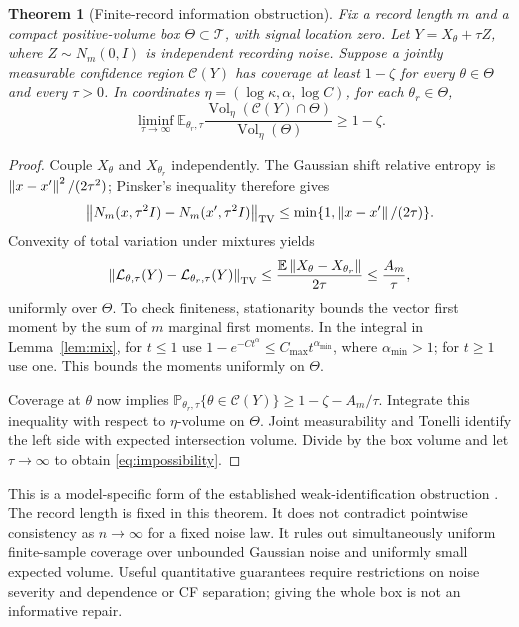 \documentclass[11pt,a4paper]{article}
\newtheorem{theorem}{Theorem}[section]
\theoremstyle{remark}\newtheorem{remark}[theorem]{Remark}
\newcommand{\E}{\mathbb E}\newcommand{\Pp}{\mathbb P}
\DeclareMathOperator{\Vol}{Vol}\DeclareMathOperator*{\argmin}{arg\,min}
\begin{document}
\begin{theorem}[Finite-record information obstruction]\label{thm:impossible}
Fix a record length $m$ and a compact positive-volume box $\Theta\subset\mathcal T$, with signal location zero. Let $Y=X_\theta+\tau Z$, where $Z\sim N_m(0,I)$ is independent recording noise. Suppose a jointly measurable confidence region $\mathcal C(Y)$ has coverage at least $1-\zeta$ for every $\theta\in\Theta$ and every $\tau>0$. In coordinates $\eta=(\log\kappa,\alpha,\log C)$, for each $\theta_r\in\Theta$,
\begin{equation}\label{eq:impossibility}
\liminf_{\tau\to\infty}\E_{\theta_r,\tau}
\frac{\Vol_\eta(\mathcal C(Y)\cap\Theta)}{\Vol_\eta(\Theta)}\ge1-\zeta.
\end{equation}
\end{theorem}
\begin{proof}
Couple $X_\theta$ and $X_{\theta_r}$ independently. The Gaussian shift relative entropy is $\left\lVert x-x'\right\rVert^2/(2\tau^2)$; Pinsker's inequality therefore gives
\[
\left\lVert N_m(x,\tau^2I)-N_m(x',\tau^2I)\right\rVert_{\rm TV}
\le\min\{1,\left\lVert x-x'\right\rVert/(2\tau)\}.
\]
Convexity of total variation under mixtures yields
\[
\norm{\mathcal L_{\theta,\tau}(Y)-\mathcal L_{\theta_r,\tau}(Y)}_{\rm TV}
\le\frac{\E\norm{X_\theta-X_{\theta_r}}}{2\tau}\le\frac{A_m}{\tau},
\]
uniformly over $\Theta$. To check finiteness, stationarity bounds the vector first moment by the sum of $m$ marginal first moments. In the integral in Lemma~\ref{lem:mix}, for $t\le1$ use $1-e^{-Ct^\alpha}\le C_{\max}t^{\alpha_{\min}}$, where $\alpha_{\min}>1$; for $t\ge1$ use one. This bounds the moments uniformly on $\Theta$.

Coverage at $\theta$ now implies
$\Pp_{\theta_r,\tau}\{\theta\in\mathcal C(Y)\}\ge1-\zeta-A_m/\tau$.
Integrate this inequality with respect to $\eta$-volume on $\Theta$. Joint measurability and Tonelli identify the left side with expected intersection volume. Divide by the box volume and let $\tau\to\infty$ to obtain \eqref{eq:impossibility}.
\end{proof}

This is a model-specific form of the established weak-identification obstruction \cite{dufour}. The record length is fixed in this theorem. It does not contradict pointwise consistency as $n\to\infty$ for a fixed noise law. It rules out simultaneously uniform finite-sample coverage over unbounded Gaussian noise and uniformly small expected volume. Useful quantitative guarantees require restrictions on noise severity and dependence or CF separation; giving the whole box is not an informative repair.
\end{document}

